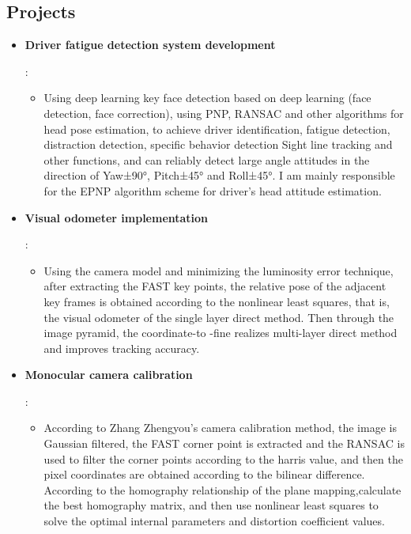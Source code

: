 \documentclass[CJK]{article}
\newcommand{\resumeItem}[2]{
  \item\small{
    \textbf{#1}{: #2 \vspace{-2pt}}
  }
}
\newcommand{\resumeSubItem}[2]{\resumeItem{#1}{#2}\vspace{-4pt}}
\newcommand{\resumeSubHeadingListStart}{\begin{itemize}[leftmargin=*]}
\newcommand{\resumeSubHeadingListEnd}{\end{itemize}}
\newcommand{\shorterSection}[1]{\vspace{-10pt}\section{#1}}
\begin{document}
\begin{CJK}{UTF8}{gkai}
\shorterSection{Projects}%
  \resumeSubHeadingListStart
    \resumeSubItem{\normalsize Driver fatigue detection system development}
     {
        \vspace{-2pt}
        \begin{itemize}
            \item Using deep learning key face detection based on deep learning (face detection, face correction), using PNP, RANSAC and other algorithms for head pose estimation, to achieve driver identification, fatigue detection, distraction detection, specific behavior detection Sight line tracking and other functions, and can reliably detect large angle attitudes in the direction of Yaw±90°, Pitch±45° and Roll±45°. I am mainly responsible for the EPNP algorithm scheme for driver's head attitude estimation.
        \end{itemize}
     }
    \resumeSubItem{\normalsize Visual odometer implementation}
      {
        \vspace{-5pt}
        \begin{itemize}
            \item Using the camera model and minimizing the luminosity error technique, after extracting the FAST key points, the relative pose of the adjacent key frames is obtained according to the nonlinear least squares, that is, the visual odometer of the single layer direct method. Then through the image pyramid, the coordinate-to -fine realizes multi-layer direct method and improves tracking accuracy.
        \end{itemize}
	 }
	\resumeSubItem{\normalsize Monocular camera calibration}
     {
        \vspace{-5pt}
        \begin{itemize}
            \item According to Zhang Zhengyou's camera calibration method, the image is Gaussian filtered, the FAST corner point is extracted and the RANSAC is used to filter the corner points according to the harris value, and then the pixel coordinates are obtained according to the bilinear difference. According to the homography relationship of the plane mapping,calculate the best homography matrix, and then use nonlinear least squares to solve the optimal internal parameters and distortion coefficient values.
        \end{itemize}
     }
  \resumeSubHeadingListEnd
  

\end{CJK}
\end{document}
